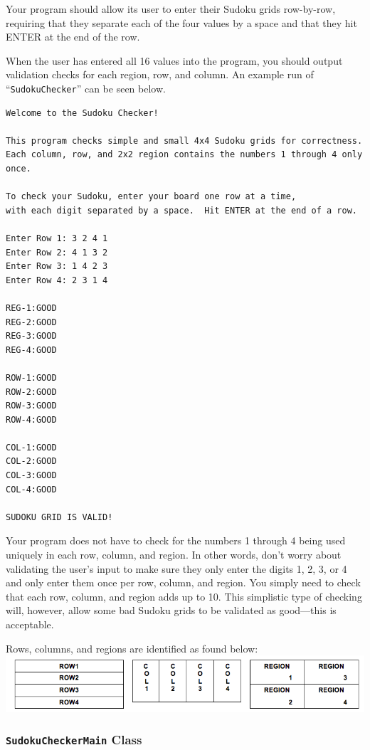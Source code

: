 \noindent Your program should allow its user to enter their Sudoku grids row-by-row, requiring that they separate each
of the four values by a space and that they hit ENTER at the end of the row.

\noindent When the user has entered all 16 values into the program, you should output validation checks for each region,
row, and column.  An example run of ``{\tt SudokuChecker}'' can be seen below.

\begin{verbatim}
Welcome to the Sudoku Checker!

This program checks simple and small 4x4 Sudoku grids for correctness.
Each column, row, and 2x2 region contains the numbers 1 through 4 only once.

To check your Sudoku, enter your board one row at a time,
with each digit separated by a space.  Hit ENTER at the end of a row.

Enter Row 1: 3 2 4 1
Enter Row 2: 4 1 3 2
Enter Row 3: 1 4 2 3
Enter Row 4: 2 3 1 4

REG-1:GOOD
REG-2:GOOD
REG-3:GOOD
REG-4:GOOD

ROW-1:GOOD
ROW-2:GOOD
ROW-3:GOOD
ROW-4:GOOD

COL-1:GOOD
COL-2:GOOD
COL-3:GOOD
COL-4:GOOD

SUDOKU GRID IS VALID!
\end{verbatim}

\newpage

\noindent Your program does not have to check for the numbers 1 through 4 being used uniquely in each row, column, and
region.  In other words, don't worry about validating the user's input to make sure they only enter the digits 1, 2, 3,
or 4 and only enter them once per row, column, and region.  You simply need to check that each row, column, and region
adds up to 10. This simplistic type of checking will, however, allow some bad Sudoku grids to be validated as
good---this is acceptable.

\noindent Rows, columns, and regions are identified as found below:\\

\vspace*{.01in}
\includegraphics[scale=0.5]{sud}

\subsubsection*{{\tt SudokuCheckerMain} Class}

